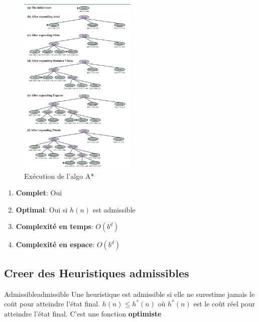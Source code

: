 \begin{figure}[H]
    \begin{center}
        \includegraphics[width=0.5\textwidth]{./pictures/astar.png}
    \end{center}
    \caption{Exécution de l'algo A*}\label{fig:astar}
\end{figure}

\begin{remarks}\leavevmode
    \begin{enumerate}
        \item \textbf{Complet}: Oui
        \item \textbf{Optimal}: Oui si $h(n)$ est admissible
        \item \textbf{Complexité en temps}: $O(b^d)$
        \item \textbf{Complexité en espace}: $O(b^d)$
    \end{enumerate}
\end{remarks}

\subsection{Creer des Heuristiques admissibles} %
\label{sub:creer_des_heuristiques_admissibles}

\begin{definition}{Admissible}{admissible}
    Une heuristique est admissible si elle ne surestime jamais le coût pour atteindre l'état final. 
    \begin{math}
        h(n) \leq h^*(n) 
    \end{math} 
    où $h^*(n)$ est le coût réel pour atteindre l'état final. 
    C'est une fonction \textbf{optimiste}
\end{definition}

